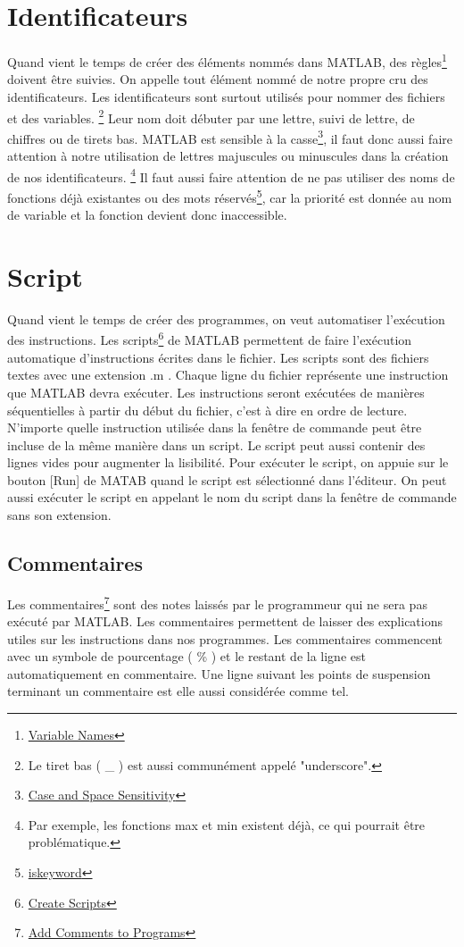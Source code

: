 \documentclass{tufte-handout}
\begin{document}
\section{Identificateurs}
Quand vient le temps de créer des éléments nommés dans MATLAB, des règles\footnote{\href{https://www.mathworks.com/help/matlab/matlab_prog/variable-names.html}{Variable Names}} doivent être suivies. On appelle tout élément nommé de notre propre cru des identificateurs. Les identificateurs sont surtout utilisés pour nommer des fichiers et des variables.
\footnote{Le tiret bas ( \_ ) est aussi communément appelé "underscore".}
Leur nom doit débuter par une lettre, suivi de lettre, de chiffres ou de tirets bas. MATLAB est sensible à la casse\footnote{\href{https://www.mathworks.com/help/matlab/matlab_prog/case-and-space-sensitivity.html}{Case and Space Sensitivity}}, il faut donc aussi faire attention à notre utilisation de lettres majuscules ou minuscules dans la création de nos identificateurs.
\footnote{Par exemple, les fonctions max et min existent déjà, ce qui pourrait être problématique.}
Il faut aussi faire attention de ne pas utiliser des noms de fonctions déjà existantes ou des mots réservés\footnote{\href{https://www.mathworks.com/help/matlab/ref/iskeyword.html}{iskeyword}}, car la priorité est donnée au nom de variable et la fonction devient donc inaccessible.

\section{Script}
Quand vient le temps de créer des programmes, on veut automatiser l'exécution des instructions. Les scripts\footnote{\href{https://www.mathworks.com/help/matlab/matlab_prog/create-scripts.html}{Create Scripts}} de MATLAB permettent de faire l'exécution automatique d'instructions écrites dans le fichier.
Les scripts sont des fichiers textes avec une extension .m . Chaque ligne du fichier représente une instruction que MATLAB devra exécuter. Les instructions seront exécutées de manières séquentielles à partir du début du fichier, c'est à dire en ordre de lecture.
N'importe quelle instruction utilisée dans la fenêtre de commande peut être incluse de la même manière dans un script. Le script peut aussi contenir des lignes vides pour augmenter la lisibilité.
Pour exécuter le script, on appuie sur le bouton [Run] de MATAB quand le script est sélectionné dans l'éditeur. On peut aussi exécuter le script en appelant le nom du script dans la fenêtre de commande sans son extension.
\subsection{Commentaires}
Les commentaires\footnote{\href{https://www.mathworks.com/help/matlab/matlab_prog/comments.html}{Add Comments to Programs}} sont des notes laissés par le programmeur qui ne sera pas exécuté par MATLAB. Les commentaires permettent de laisser des explications utiles sur les instructions dans nos programmes.
Les commentaires commencent avec un symbole de pourcentage ( \% ) et le restant de la ligne est automatiquement en commentaire. Une ligne suivant les points de suspension terminant un commentaire est elle aussi considérée comme tel.
\end{document}
